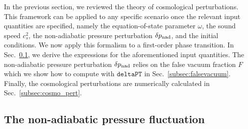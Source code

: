 \documentclass[twocolumn,superscriptaddress,aps,preprintnumbers,amsmath,amssymb,prl,footinbib]{revtex4-2}
\newcommand{\deltaPT}{{\texttt{deltaPT}}}
\begin{document}
In the previous section, we reviewed the theory of cosmological perturbations. This framework can be applied to any specific scenario once the relevant input quantities are specified, namely the equation-of-state parameter $\omega$, the sound speed $c_s^2$, the non-adiabatic pressure perturbation $\delta p_{\rm nad}$, and the initial conditions.
We now apply this formalism to a first-order phase transition. In Sec.~\ref{subsec:deltapnad}, we derive the expressions for the aforementioned input quantities. The non-adiabatic pressure perturbation $\delta p_{\rm nad}$ relies on the false vacuum fraction $F$ which we show how to compute with $\deltaPT$ in Sec.~\ref{subsec:falsevacuum}. Finally, the cosmological perturbations are numerically calculated in Sec.~\ref{subsec:cosmo_pert}.


\subsection{The non-adiabatic pressure fluctuation}
\label{subsec:deltapnad}
\end{document}
